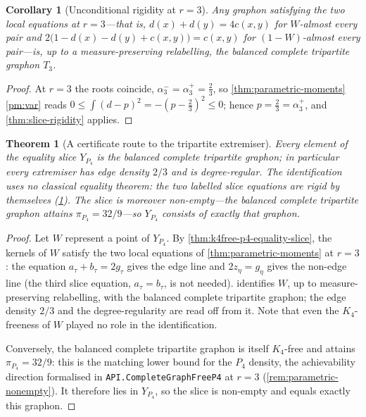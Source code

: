 \documentclass[11pt]{article}
\newtheorem{theorem}{Theorem}
\newtheorem{corollary}[corollary]{Corollary}
\theoremstyle{definition}
\begin{document}
\begin{corollary}[Unconditional rigidity at $r=3$]\label{cor:r3-rigidity}
Any graphon satisfying the two local equations at $r=3$---that is,
$d(x)+d(y)=4c(x,y)$ for $W$-almost every pair and
$2\bigl(1-d(x)-d(y)+c(x,y)\bigr)=c(x,y)$ for $(1-W)$-almost every pair---is, up to a
measure-preserving relabelling, the balanced complete tripartite graphon $T_3$.
\end{corollary}

\begin{proof}
At $r=3$ the roots coincide, $\alpha_3^-=\alpha_3^+=\frac23$, so
\cref{thm:parametric-moments}\ref{pm:var} reads
$0\le\int(d-p)^2=-(p-\frac23)^2\le0$; hence $p=\frac23=\alpha_3^+$, and
\cref{thm:slice-rigidity} applies.
\end{proof}

\begin{theorem}[A certificate route to the tripartite extremiser]\label{thm:k4free-p4-tripartite}
Every element of the equality slice $Y_{P_4}$ is the balanced complete tripartite
graphon; in particular every extremiser has edge density $2/3$ and is degree-regular.
The identification uses no classical equality theorem: the two labelled slice equations
are rigid by themselves (\cref{cor:r3-rigidity}).  The slice is moreover
non-empty---the balanced complete tripartite graphon attains $\pi_{P_4}=32/9$---so
$Y_{P_4}$ consists of exactly that graphon.
\end{theorem}

\begin{proof}
Let $W$ represent a point of $Y_{P_4}$.  By \cref{thm:k4free-p4-equality-slice}, the
kernels of $W$ satisfy the two local equations of \cref{thm:parametric-moments} at
$r=3$: the equation $a_\tau+b_\tau=2g_\tau$ gives the edge line and $2z_\eta=g_\eta$
gives the non-edge line (the third slice equation, $a_\tau=b_\tau$, is not needed).
 identifies $W$, up to measure-preserving relabelling, with the
balanced complete tripartite graphon; the edge density $2/3$ and the degree-regularity
are read off from it.  Note that even the $K_4$-freeness of $W$ played no role in the
identification.

Conversely, the balanced complete tripartite graphon is itself $K_4$-free and attains
$\pi_{P_4}=32/9$: this is the matching lower bound for the $P_4$ density, the achievability
direction formalised in \texttt{API.CompleteGraphFreeP4} at $r=3$
(\cref{rem:parametric-nonempty}).  It therefore lies in
$Y_{P_4}$, so the slice is non-empty and equals exactly this graphon.
\end{proof}
\end{document}
